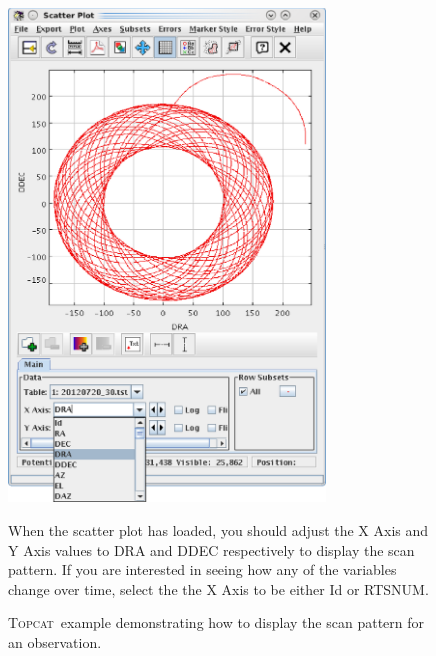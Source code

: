 \documentclass[twoside,11pt]{article}
\newenvironment{fmpage}[1]
{\begin{lrbox}{\fmbox}\begin{minipage}{#1}}
{\end{minipage}\end{lrbox}\fbox{\usebox{\fmbox}}}
\newcounter{box}
\newcommand{\htmladdnormallink}[2]{#1}
\renewcommand{\_}{\texttt{\symbol{95}}}
\newcommand{\topcat}{\htmladdnormallink{\textsc{Topcat}}{http://www.starlink.ac.uk/topcat}}
\begin{document}
\begin{figure}[ht!]
\begin{center}
\begin{fmpage}{0.95\linewidth}
\vspace{0.5cm}

\begin{minipage}[c]{0.6\linewidth}
\centering
\includegraphics[width=0.75\textwidth]{topcat2.eps}
\vspace{0.2cm}
\end{minipage}
\hspace{0.3cm}
\begin{minipage}[c]{0.32\linewidth}
When the  scatter plot has loaded, you should adjust the X Axis and Y Axis values to DRA and DDEC respectively to display the scan pattern. If you are interested in seeing how any of the variables change over time, select the the X Axis to be either Id or RTS\_NUM.

\end{minipage}

\end{fmpage}
\end{center}
\caption{\small \topcat\ example demonstrating how to display the scan pattern for an observation.}
\label{fig:topcat} 
\end{figure}
\end{document}
